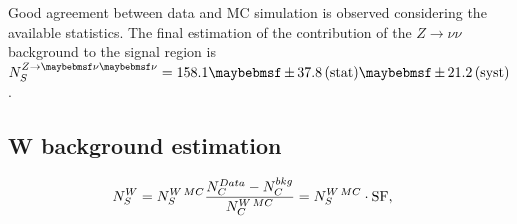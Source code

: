 Good agreement between data and \gls{MC} simulation is observed considering the available statistics. The final estimation of the contribution of the $Z\rightarrow \nu\nu$ background to the signal region is $N_{S}^{Z\rightarrow\nu\nu}= 158.1 \pm 37.8 \stat \pm 21.2 \syst$.

\subsection{W background estimation}
\label{SECTION:ParkedDataAnalysis_ControlRegions_WBackground}


% 
\begin{align}
  \begin{split}
  \label{eq:ddmethod}
  N_{S}^{W}&=N_{S}^{W\,MC}\frac{N_{C}^{Data}-N_{C}^{bkg}}{N_{C}^{W\,MC}}=N_{S}^{W\,MC}\cdot \rm{SF},
  \end{split}
\end{align}
% 




